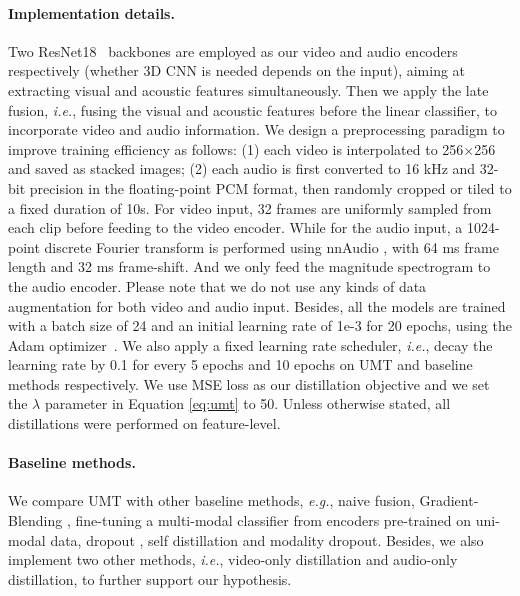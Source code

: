 \paragraph{Implementation details.} Two ResNet18~\cite{he2016deep} backbones are employed as our video and audio encoders respectively (whether 3D CNN is needed depends on the input), aiming at extracting visual and acoustic features simultaneously. Then we apply the late fusion, \textit{i.e.}, fusing the visual and acoustic features before the linear classifier, to incorporate video and audio information. We design a preprocessing paradigm to improve training efficiency as follows: (1) each video is interpolated to 256$\times$256 and saved as stacked images; (2) each audio is first converted to 16 kHz and 32-bit precision in the floating-point PCM format, then randomly cropped or tiled to a fixed duration of 10s. For video input, 32 frames are uniformly sampled from each clip before feeding to the video encoder. While for the audio input, a 1024-point discrete Fourier transform is performed using nnAudio \cite{cheuk2020nnaudio}, with 64 ms frame length and 32 ms frame-shift. And we only feed the magnitude spectrogram to the audio encoder. Please note that we do not use any kinds of data augmentation for both video and audio input. Besides, all the models are trained with a batch size of 24 and an initial learning rate of 1e-3 for 20 epochs, using the Adam optimizer~\cite{kingma2014adam}. We also apply a fixed learning rate scheduler, \textit{i.e.}, decay the learning rate by 0.1 for every 5 epochs and 10 epochs on UMT and baseline methods respectively. We use MSE loss as our distillation objective and we set the $\lambda$ parameter in Equation \eqref{eq:umt} to 50. Unless otherwise stated, all distillations were performed on feature-level.  





\paragraph{Baseline methods.} 
We compare UMT with other baseline methods, \textit{e.g.}, naive fusion, Gradient-Blending \cite{wang2020makes}, fine-tuning a multi-modal classifier from encoders pre-trained on uni-modal data, dropout \cite{srivastava2014dropout}, self distillation \cite{zhang2019your} and modality dropout. Besides, we also implement two other methods, \textit{i.e.}, video-only distillation and audio-only distillation, to further support our hypothesis. 

